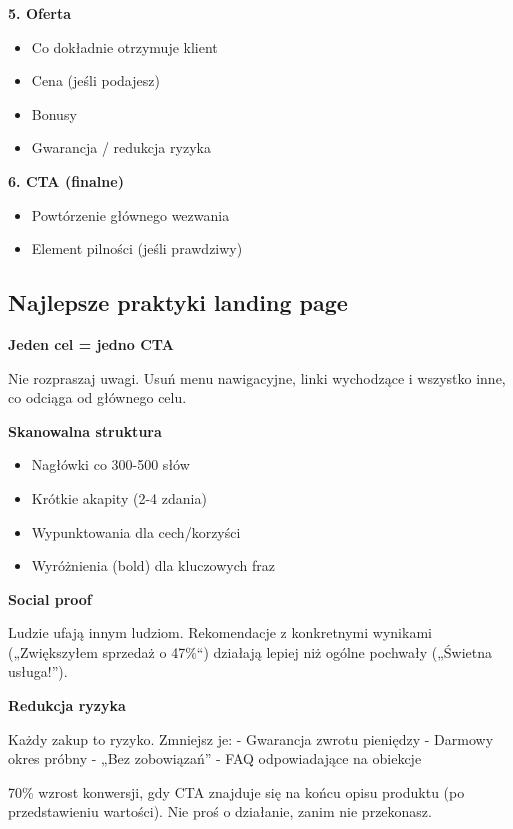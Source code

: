 \documentclass[
  12pt,
  a4paper,
  twoside,
  openright,
  12pt,
  DIV=12,
  BCOR=12mm]{scrbook}
\providecommand{\tightlist}{%
  \setlength{\itemsep}{0pt}\setlength{\parskip}{0pt}}\usepackage{longtable,booktabs,array}
\begin{document}
\textbf{5. Oferta}

\begin{itemize}
\tightlist
\item
  Co dokładnie otrzymuje klient
\item
  Cena (jeśli podajesz)
\item
  Bonusy
\item
  Gwarancja / redukcja ryzyka
\end{itemize}

\textbf{6. CTA (finalne)}

\begin{itemize}
\tightlist
\item
  Powtórzenie głównego wezwania
\item
  Element pilności (jeśli prawdziwy)
\end{itemize}

\subsection{Najlepsze praktyki landing
page}\label{najlepsze-praktyki-landing-page}

\textbf{Jeden cel = jedno CTA}

Nie rozpraszaj uwagi. Usuń menu nawigacyjne, linki wychodzące i wszystko
inne, co odciąga od głównego celu.

\textbf{Skanowalna struktura}

\begin{itemize}
\tightlist
\item
  Nagłówki co 300-500 słów
\item
  Krótkie akapity (2-4 zdania)
\item
  Wypunktowania dla cech/korzyści
\item
  Wyróżnienia (bold) dla kluczowych fraz
\end{itemize}

\textbf{Social proof}

Ludzie ufają innym ludziom. Rekomendacje z konkretnymi wynikami
(„Zwiększyłem sprzedaż o 47\%``) działają lepiej niż ogólne pochwały
(„Świetna usługa!'').

\textbf{Redukcja ryzyka}

Każdy zakup to ryzyko. Zmniejsz je: - Gwarancja zwrotu pieniędzy -
Darmowy okres próbny - „Bez zobowiązań'' - FAQ odpowiadające na obiekcje

\begin{wazne}
70\% wzrost konwersji, gdy CTA znajduje się na końcu opisu produktu (po przedstawieniu wartości). Nie proś o działanie, zanim nie przekonasz.
\end{wazne}
\end{document}

